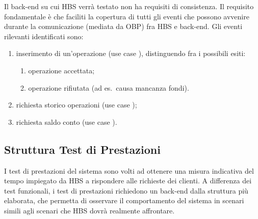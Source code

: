 Il back-end su cui HBS verr\`a testato non ha requisiti di consistenza.
Il requisito fondamentale \`e che faciliti la copertura di tutti gli eventi che possono avvenire durante la comunicazione (mediata da OBP) fra HBS e back-end.
Gli eventi rilevanti identificati sono:
\begin{enumerate}
	\item inserimento di un'operazione (use case \iducDISPAG), distinguendo fra i possibili esiti:
		\begin{enumerate}
			\item operazione accettata;
			\item operazione rifiutata (ad es.\ causa mancanza fondi).
		\end{enumerate}
	\item richiesta storico operazioni (use case \iducVERSTOR);
	\item richiesta saldo conto (use case \iducVERSAL).
\end{enumerate}

\subsection{Struttura Test di Prestazioni}

I test di prestazioni del sistema sono volti ad ottenere una misura indicativa del tempo impiegato da HBS a rispondere alle richieste dei clienti.
A differenza dei test funzionali, i test di prestazioni richiedono un back-end dalla struttura pi\`u elaborata, che permetta di osservare il comportamento del sistema in scenari simili agli scenari che HBS dovr\`a realmente affrontare.


